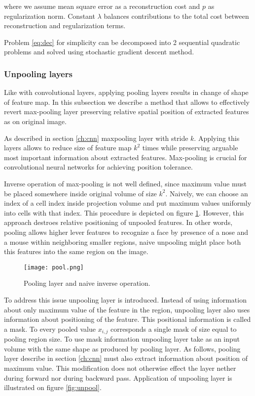 where we assume mean square error as a reconstruction cost and $p$ as regularization norm.
Constant $\lambda$ balances contributions to the total cost between reconstruction and regularization terms.

Problem \ref{eq:dec} for simplicity can be decomposed into 2 sequential quadratic problems and solved using stochastic gradient descent method.

\subsubsection{Unpooling layers}

Like with convolutional layers, applying pooling layers results in change of shape of feature map.
In this subsection we describe a method that allows to effectively revert max-pooling layer preserving relative spatial position of extracted features as on original image.

As described in section \ref{ch:cnn} maxpooling layer with stride $k$.
Applying this layers allows to reduce size of feature map $k^2$ times while preserving arguable most important information about extracted features.
Max-pooling is crucial for convolutional neural networks for achieving position tolerance.

Inverse operation of max-pooling is not well defined, since maximum value must be placed somewhere inside original volume of size $k^2$. Naively, we can choose an index of a cell index inside projection volume and put maximum values uniformly into cells with that index.
This procedure is depicted on figure \ref{fig:pool}.
However, this approach destroes relative positioning of unpooled features.
In other words, pooling allows higher lever features to recognize a face by presence of a nose and a mouse within neighboring smaller regions, naive unpooling might place both this features into the same region on the image.

\begin{figure}[h!]
  \centering
    \texttt{[image: pool.png]}
  \caption{Pooling layer and naive inverse operation.}
  \label{fig:pool}
\end{figure}

To address this issue unpooling layer is introduced. Instead of using information about only maximum value of the feature in the region, unpooling layer also uses information about positioning of the feature. This positional information is called a mask. To every pooled value $x_{i,j}$ corresponds a single mask of size equal to pooling region size. To use mask information  unpooling layer take as an input volume with the same shape as produced by pooling layer. As follows, pooling layer describe in section \ref{ch:cnn} must also extract information about position of maximum value. This modification does not otherwise effect the layer nether during forward nor during backward pass. Application of unpooling layer is illustrated on figure \ref{fig:unpool}.

